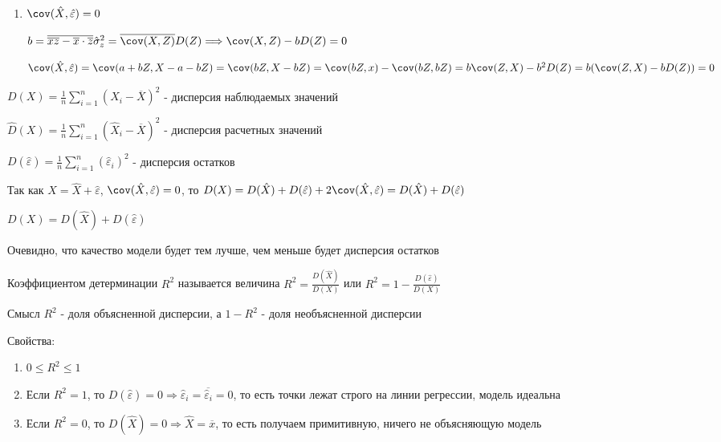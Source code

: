 \begin{enumerate}
\begin{enumerate}
        \item $\cov (\hat X, \hat \varepsilon) = 0$

        \begin{MyProof}
            $b = \overline{\overline{xz} - \overline{x} \cdot \overline{z}}{\hat \sigma^2_z} = \overline{\cov (X, Z)}{D(Z)} \Longrightarrow \cov (X, Z) - b D(Z) = 0$

            $\cov (\hat X, \hat \varepsilon) = \cov (a + b Z, X - a - bZ) = \cov (bZ, X - bZ) = \cov (bZ, x) - \cov (bZ, bZ) = b \cov (Z, X) - b^2 D(Z) = b (\cov (Z, X) - b D(Z)) = 0$
        \end{MyProof}
    \end{enumerate}

    \Def $D(X) = \frac{1}{n} \sum_{i = 1}^n (X_i - \overline{X})^2$ - дисперсия наблюдаемых значений

    \Defs $\hat D(X) = \frac{1}{n} \sum_{i = 1}^n (\hat X_i - \overline{X})^2$ - дисперсия расчетных значений

    \Defs $D(\hat \varepsilon) = \frac{1}{n} \sum_{i = 1}^n (\hat \varepsilon_i)^2$ - дисперсия остатков

    Так как $X = \hat X + \hat \varepsilon$, $\cov (\hat X, \hat \varepsilon) = 0$, то $D(X) = D(\hat X) + D(\hat \varepsilon) + 2\cov (\hat X, \hat \varepsilon) = D(\hat X) + D(\hat \varepsilon)$

    \begin{MyTheorem}
        \Ths $D(X) = D(\hat X) + D(\hat \varepsilon)$
    \end{MyTheorem}

    Очевидно, что качество модели будет тем лучше, чем меньше будет дисперсия остатков

    \Def Коэффициентом детерминации $R^2$ называется величина $R^2 = \frac{D(\hat X)}{D(X)}$ или $R^2 = 1 - \frac{D(\hat \varepsilon)}{D(X)}$

    \Notas Смысл $R^2$ - доля объясненной дисперсии, а $1 - R^2$ - доля необъясненной дисперсии

    Свойства: 

    \begin{enumerate}
        \item $0 \leq R^2 \leq 1$
        \item Если $R^2 = 1$, то $D(\hat \varepsilon) = 0 \Longrightarrow \hat \varepsilon_i = \overline{\hat \varepsilon_i} = 0$, то есть точки лежат строго на 
        линии регрессии, модель идеальна

        \item Если $R^2 = 0$, то $D(\hat X) = 0 \Longrightarrow \hat X = \overline{x}$, то есть получаем примитивную, ничего не объясняющую модель
    \end{enumerate}


\end{enumerate}
